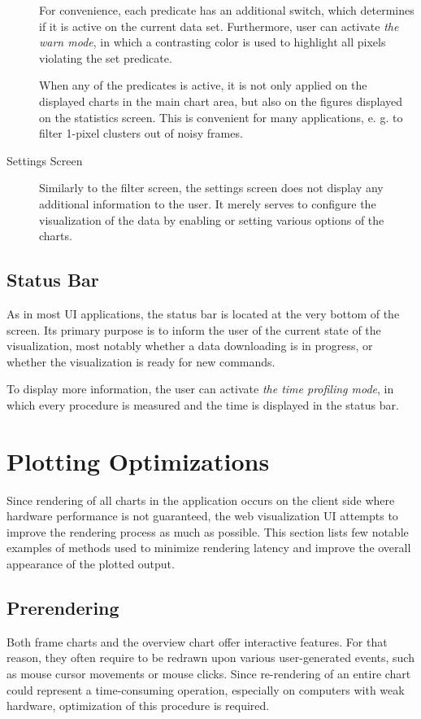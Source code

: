 \begin{description}
	For convenience, each predicate has an additional switch, which determines if it is active on the current data set. Furthermore, user can activate \textit{the warn mode}, in which a contrasting color is used to highlight all pixels violating the set predicate.

	When any of the predicates is active, it is not only applied on the displayed charts in the main chart area, but also on the figures displayed on the statistics screen. This is convenient for many applications, e. g. to filter 1-pixel clusters out of noisy frames.

	\item[Settings Screen]
	Similarly to the filter screen, the settings screen does not display any additional information to the user. It merely serves to configure the visualization of the data by enabling or setting various options of the charts.
\end{description}

\subsection{Status Bar}
As in most UI applications, the status bar is located at the very bottom of the screen. Its primary purpose is to inform the user of the current state of the visualization, most notably whether a data downloading is in progress, or whether the visualization is ready for new commands.

To display more information, the user can activate \textit{the time profiling mode}, in which every procedure is measured and the time is displayed in the status bar.

\section{Plotting Optimizations}
Since rendering of all charts in the application occurs on the client side where hardware performance is not guaranteed, the web visualization UI attempts to improve the rendering process as much as possible. This section lists few notable examples of methods used to minimize rendering latency and improve the overall appearance of the plotted output.

\subsection{Prerendering}
Both frame charts and the overview chart offer interactive features. For that reason, they often require to be redrawn upon various user-generated events, such as mouse cursor movements or mouse clicks. Since re-rendering of an entire chart could represent a time-consuming operation, especially on computers with weak hardware, optimization of this procedure is required.

